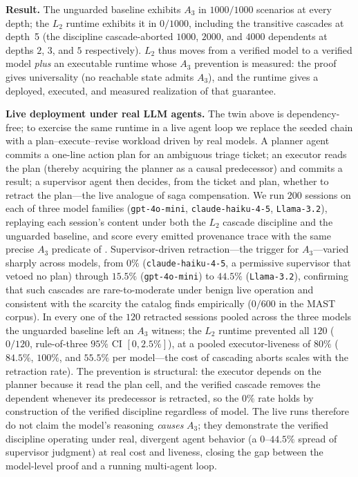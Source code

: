 \documentclass[journal,compsoc,10pt]{IEEEtran}
\theoremstyle{definition}
\theoremstyle{remark}
\begin{document}
\medskip
\noindent\textbf{Result.}
The unguarded baseline exhibits $A_3$ in $1000/1000$ scenarios at every
depth; the $L_2$ runtime exhibits it in $0/1000$, including the transitive
cascades at depth~5 (the discipline cascade-aborted $1000$, $2000$, and
$4000$ dependents at depths $2$, $3$, and $5$ respectively). $L_2$ thus
moves from a verified model to a verified model \emph{plus} an executable
runtime whose $A_3$ prevention is measured: the proof gives universality (no
reachable state admits $A_3$), and the runtime gives a deployed, executed,
and measured realization of that guarantee.

\medskip
\noindent\textbf{Live deployment under real LLM agents.}
The twin above is dependency-free; to exercise the same runtime in a live
agent loop we replace the seeded chain with a plan--execute--revise workload
driven by real models. A planner agent commits a one-line action plan for an
ambiguous triage ticket; an executor reads the plan (thereby acquiring the
planner as a causal predecessor) and commits a result; a supervisor agent then
decides, from the ticket and plan, whether to retract the plan---the live
analogue of saga compensation. We run $200$ sessions on each of three model
families (\texttt{gpt-4o-mini}, \texttt{claude-haiku-4-5}, \texttt{Llama-3.2}),
replaying each session's content under both the $L_2$ cascade discipline and
the unguarded baseline, and score every emitted provenance trace with the same
precise $A_3$ predicate of . Supervisor-driven retraction---the
trigger for $A_3$---varied sharply across models, from $0\%$
(\texttt{claude-haiku-4-5}, a permissive supervisor that vetoed no plan)
through $15.5\%$ (\texttt{gpt-4o-mini}) to $44.5\%$ (\texttt{Llama-3.2}),
confirming that such cascades are rare-to-moderate under benign live operation
and consistent with the scarcity the catalog finds empirically ($0/600$ in the
MAST corpus). In every one of the $120$ retracted sessions pooled across the
three models the unguarded baseline left an $A_3$ witness; the $L_2$ runtime
prevented all $120$ ($0/120$, rule-of-three $95\%$ CI $[0,2.5\%]$), at a pooled
executor-liveness of $80\%$ ($84.5\%$, $100\%$, and $55.5\%$ per model---the
cost of cascading aborts scales with the retraction rate). The prevention is
structural: the executor depends on the planner because it read the plan cell,
and the verified cascade removes the dependent whenever its predecessor is
retracted, so the $0\%$ rate holds by construction of the verified discipline
regardless of model. The live runs therefore do not claim the model's
reasoning \emph{causes} $A_3$; they demonstrate the verified discipline
operating under real, divergent agent behavior (a $0$--$44.5\%$ spread of
supervisor judgment) at real cost and liveness, closing the gap between the
model-level proof and a running multi-agent loop.
\end{document}
